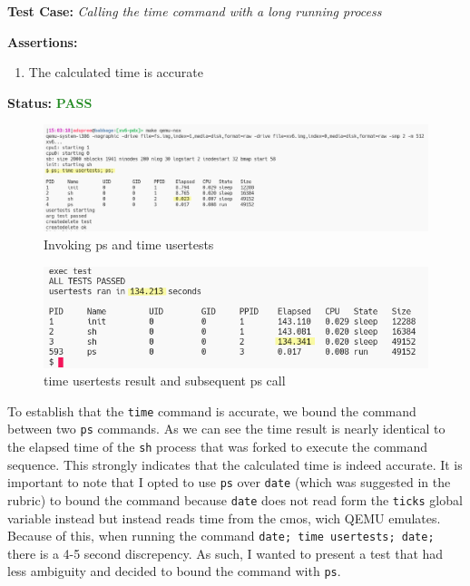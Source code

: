 \documentclass[11pt,letterpaper]{report}
\newcommand{\code}[1]{\colorbox{codegray}{\texttt{#1}}}
\begin{document}
{  \noindent\textbf{Test Case:} \emph{Calling the time command with a long running process}

  \noindent\textbf{Assertions:}
  \begin{enumerate}[]
  \item The calculated time is accurate
  \end{enumerate}  
  
  \noindent\textbf{Status:} \textcolor{ForestGreen}{\textbf{PASS}}
  
  \begin{figure}[h!]
	\centering
	\includegraphics[width=1\linewidth]{time-invocation.png}
	\caption[img]{Invoking ps and time usertests}
	\label{fig:P1compileP0-1}
  \end{figure}

  \begin{figure}[h!]
	\centering
	\includegraphics[width=1\linewidth]{time-result.png}
	\caption[img]{time usertests result and subsequent ps call}
	\label{fig:P1compileP0-1}
  \end{figure}

  \pagebreak

  To establish that the \code{time} command is accurate, we bound the command between
  two \code{ps} commands. As we can see the time result is nearly identical to the 
  elapsed time of the \code{sh} process that was forked to execute the command sequence.
  This strongly indicates that the calculated time is indeed accurate. It is important to note 
  that I opted to use \code{ps} over \code{date} (which was suggested in the rubric) to bound
  the command because \code{date} does not read form the \code{ticks} global variable instead 
  but instead reads time from the cmos, wich QEMU emulates. Because of this, when running the command 
  \code{date; time usertests; date;} there is a 4-5 second discrepency. As such, I wanted
  to present a test that had less ambiguity and decided to bound the command with \code{ps}. 

}
\end{document}
